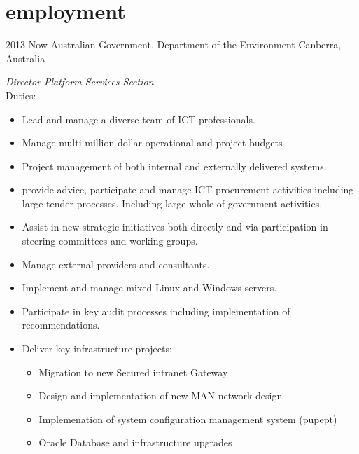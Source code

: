 \documentclass[]{friggeri-cv} %
\begin{document}
\newpage

\section{employment}
\begin{entrylist}
\entry
{2013-Now}
{Australian Government, Department of the Environment}
{Canberra, Australia}
{\emph{Director Platform Services Section} \\
Duties:
\begin{itemize}
\item Lead and manage a diverse team of ICT professionals.
\item Manage multi-million dollar operational and project budgets
\item Project management of both internal and externally delivered systems.
\item provide advice, participate and manage ICT procurement activities including large tender processes. Including large whole of government activities.
\item Assist in new strategic initiatives both directly and via participation in steering committees and working groups.
\item Manage external providers and consultants.
\item Implement and manage mixed Linux and Windows servers.
\item Participate in key audit processes including implementation of recommendations.
\item Deliver key infrastructure projects:
\begin{itemize}
\item Migration to new Secured intranet Gateway
\item Design and implementation of new MAN network design
\item Implemenation of system configuration management system (pupept)
\item Oracle Database and infrastructure upgrades
\end{itemize}
\end{itemize}}
\end{entrylist}
\end{document}
